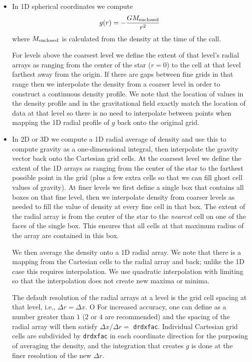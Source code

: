 \begin{itemize}

\item In 1D spherical coordinates we compute
  \begin{equation}
    g(r) = -\frac{G M_{\rm enclosed}}{ r^2}
  \end{equation}
  where $M_{\rm enclosed}$ is calculated from the density at the time
  of the call.  

  For levels above the coarsest level we define the extent of that
  level's radial arrays as ranging from the center of the star ($r=0$)
  to the cell at that level farthest away from the origin.  If there
  are gaps between fine grids in that range then we interpolate the
  density from a coarser level in order to construct a continuous
  density profile.  We note that the location of values in the density
  profile and in the gravitational field exactly match the location of
  data at that level so there is no need to interpolate between points
  when mapping the 1D radial profile of $g$ back onto the original
  grid.

\item In 2D or 3D we compute a 1D radial average of density and use
  this to compute gravity as a one-dimensional integral, then
  interpolate the gravity vector back onto the Cartesian grid
  cells. At the coarsest level we define the extent of the 1D arrays
  as ranging from the center of the star to the farthest possible
  point in the grid (plus a few extra cells so that we can fill ghost
  cell values of gravity).  At finer levels we first define a single
  box that contains all boxes on that fine level, then we interpolate
  density from coarser levels as needed to fill the value of density
  at every fine cell in that box.  The extent of the radial array is
  from the center of the star to the {\em nearest} cell on one of the
  faces of the single box.  This ensures that all cells at that
  maximum radius of the array are contained in this box.

We then average the density onto a 1D radial array.  We note that
there is a mapping from the Cartesian cells to the radial array and
back; unlike the 1D case this requires interpolation. We use quadratic
interpolation with limiting so that the interpolation does not create
new maxima or minima.

The default resolution of the radial arrays at a level is the grid
cell spacing at that level, i.e., $\Delta r = \Delta x$. O For
increased accuracy, one can define  as a number
greater than $1$ ($2$ or $4$ are recommended) and the spacing of the
radial array will then satisfy $\Delta x / \Delta r = $ {\tt drdxfac}.
Individual Cartesian grid cells are subdivided by {\tt drdxfac} in
each coordinate direction for the purposing of averaging the density,
and the integration that creates $g$ is done at the finer resolution
of the new $\Delta r$.


\end{itemize}

